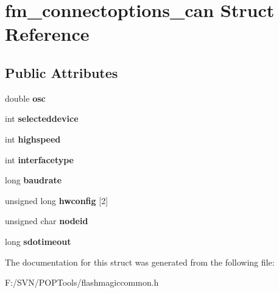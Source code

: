 \hypertarget{structfm__connectoptions__can}{\section{fm\-\_\-connectoptions\-\_\-can Struct Reference}
\label{structfm__connectoptions__can}
}
\subsection*{Public Attributes}
\begin{DoxyCompactItemize}
\item 
\hypertarget{structfm__connectoptions__can_aab2a34800d6c9c5147a32978b9cf064e}{double {\bfseries osc}}\label{structfm__connectoptions__can_aab2a34800d6c9c5147a32978b9cf064e}

\item 
\hypertarget{structfm__connectoptions__can_a68f4164503ad9c78fd40d2558a62aa85}{int {\bfseries selecteddevice}}\label{structfm__connectoptions__can_a68f4164503ad9c78fd40d2558a62aa85}

\item 
\hypertarget{structfm__connectoptions__can_aedda769bcf313eb27a2b2aa9c0050da1}{int {\bfseries highspeed}}\label{structfm__connectoptions__can_aedda769bcf313eb27a2b2aa9c0050da1}

\item 
\hypertarget{structfm__connectoptions__can_adca85c7627d96ce661ffdc184cf4e1e6}{int {\bfseries interfacetype}}\label{structfm__connectoptions__can_adca85c7627d96ce661ffdc184cf4e1e6}

\item 
\hypertarget{structfm__connectoptions__can_a825eabcd2e80faa2033325b994f31579}{long {\bfseries baudrate}}\label{structfm__connectoptions__can_a825eabcd2e80faa2033325b994f31579}

\item 
\hypertarget{structfm__connectoptions__can_aa9403bc7331bab86e564ef6e6e4efaac}{unsigned long {\bfseries hwconfig} \mbox{[}2\mbox{]}}\label{structfm__connectoptions__can_aa9403bc7331bab86e564ef6e6e4efaac}

\item 
\hypertarget{structfm__connectoptions__can_ac618daf5113c5f04b098c208c0dba03c}{unsigned char {\bfseries nodeid}}\label{structfm__connectoptions__can_ac618daf5113c5f04b098c208c0dba03c}

\item 
\hypertarget{structfm__connectoptions__can_a34d62c8558a184115cd76b51e4faca8b}{long {\bfseries sdotimeout}}\label{structfm__connectoptions__can_a34d62c8558a184115cd76b51e4faca8b}

\end{DoxyCompactItemize}


The documentation for this struct was generated from the following file\-:\begin{DoxyCompactItemize}
\item 
F\-:/\-S\-V\-N/\-P\-O\-P\-Tools/flashmagiccommon.\-h\end{DoxyCompactItemize}
